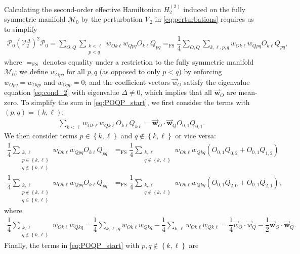 \documentclass[nofootinbib,notitlepage,11pt]{revtex4-2}
\newcommand{\f}[2]{\dfrac{#1}{#2}} %
\newcommand{\p}[1]{\left(#1\right)} %
\renewcommand{\set}[1]{\left\{#1\right\}} %
\renewcommand{\c}{\cdot} %
\newcommand{\m}{\bm} %
\renewcommand{\v}{\vec} %
\newcommand{\1}{\mathds{1}}
\newcommand{\M}{\mathcal{M}}
\renewcommand{\P}{\mathcal{P}}
\newcommand{\V}{\mathcal{V}}
\newcommand{\EQFS}{=_{\text{FS}}}
\begin{document}
Calculating the second-order effective Hamiltonian $H_2^{(2)}$ induced
on the fully symmetric manifold $\M_0$ by the perturbation $\V_2$ in
\eqref{eq:perturbations} requires us to simplify
\begin{align}
  \P_0 \p{\V_2^\Delta}^2 \P_0
  = \sum_{O,Q} \sum_{\substack{k<\ell\\p<q}}
  w_{Ok\ell} w_{Qpq} O_{k\ell} Q_{pq}
  \EQFS \f14 \sum_{O,Q} \sum_{k,\ell,p,q}
  w_{Ok\ell} w_{Qpq} O_{k\ell} Q_{pq},
  \label{eq:POQP_start}
\end{align}
where $\EQFS$ denotes equality under a restriction to the fully
symmetric manifold $\M_0$; we define $w_{Opq}$ for all $p,q$ (as
opposed to only $p<q$) by enforcing $w_{Opq}=w_{Oqp}$ and $w_{Opp}=0$;
and the coefficient vectors $\v w_O$ satisfy the eigenvalue equation
\eqref{eq:cond_2} with eigenvalue $\Delta\ne0$, which implies that all
$\v{\m w}_O$ are mean-zero.  To simplify the sum in
\eqref{eq:POQP_start}, we first consider the terms with
$\p{p,q}=\p{k,\ell}$:
\begin{align}
  \sum_{k<\ell}
  w_{Ok\ell} w_{Qk\ell} O_{k\ell} Q_{k\ell}
  = \v{\m w}_O \c \v{\m w}_Q O_{0,1} Q_{0,1}.
\end{align}
We then consider terms $p\in\set{k,\ell}$ and $q\notin\set{k,\ell}$ or
vice versa:
\begin{align}
  \f14 \sum_{\substack{k,\ell\\p\in\set{k,\ell}\\q\notin\set{k,\ell}}}
  w_{Ok\ell} w_{Qpq} O_{k\ell} Q_{pq}
  &\EQFS \f14 \sum_{\substack{k,\ell\\q\notin\set{k,\ell}}}
  w_{Ok\ell} w_{Qkq} \p{O_{0,1} Q_{0,2} + O_{0,1} Q_{1,2}} \\
  \f14 \sum_{\substack{k,\ell\\p\notin\set{k,\ell}\\q\in\set{k,\ell}}}
  w_{Ok\ell} w_{Qpq} O_{k\ell} Q_{pq}
  &\EQFS \f14 \sum_{\substack{k,\ell\\q\notin\set{k,\ell}}}
  w_{Ok\ell} w_{Qkq} \p{O_{0,1} Q_{2,0} + O_{0,1} Q_{2,1}},
\end{align}
where
\begin{align}
  \f14 \sum_{\substack{k,\ell\\q\notin\set{k,\ell}}} w_{Ok\ell} w_{Qkq}
  = \f14 \sum_{k,\ell,q} w_{Ok\ell} w_{Qkq}
  - \f14 \sum_{k,\ell} w_{Ok\ell} w_{Qk\ell}
  = \f14 \v w_O\c\v w_Q - \f12 \v{\m w}_O \c \v{\m w}_Q.
\end{align}
Finally, the terms in \eqref{eq:POQP_start} with
$p,q\notin\set{k,\ell}$ are
\end{document}
